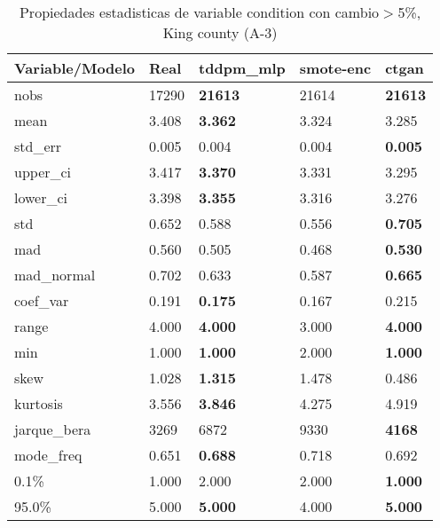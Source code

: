\begin{table}[H]
\centering
\fontsize{8}{14}\selectfont
\caption{Propiedades estadisticas de variable condition con cambio\ensuremath{>}5\%, King county (A-3)}
\label{table-stats-king county-a-3-condition-short}
\begin{tabular}{|l|m{10em}|m{10em}|m{10em}|m{10em}|}
\hline
 \rowcolor[gray]{0.8}
Variable/Modelo & Real & tddpm\_mlp & smote-enc & ctgan \\
\hline nobs & 17290 & \bfseries 21613 & \cellcolor[rgb]{0.9, 0.54, 0.52} 21614 & \bfseries 21613 \\
\hline mean & 3.408 & \bfseries 3.362 & 3.324 & \cellcolor[rgb]{0.9, 0.54, 0.52} 3.285 \\
\hline std\_err & 0.005 & 0.004 & \cellcolor[rgb]{0.9, 0.54, 0.52} 0.004 & \bfseries 0.005 \\
\hline upper\_ci & 3.417 & \bfseries 3.370 & 3.331 & \cellcolor[rgb]{0.9, 0.54, 0.52} 3.295 \\
\hline lower\_ci & 3.398 & \bfseries 3.355 & 3.316 & \cellcolor[rgb]{0.9, 0.54, 0.52} 3.276 \\
\hline std & 0.652 & 0.588 & \cellcolor[rgb]{0.9, 0.54, 0.52} 0.556 & \bfseries 0.705 \\
\hline mad & 0.560 & 0.505 & \cellcolor[rgb]{0.9, 0.54, 0.52} 0.468 & \bfseries 0.530 \\
\hline mad\_normal & 0.702 & 0.633 & \cellcolor[rgb]{0.9, 0.54, 0.52} 0.587 & \bfseries 0.665 \\
\hline coef\_var & 0.191 & \bfseries 0.175 & \cellcolor[rgb]{0.9, 0.54, 0.52} 0.167 & 0.215 \\
\hline range & 4.000 & \bfseries 4.000 & \cellcolor[rgb]{0.9, 0.54, 0.52} 3.000 & \bfseries 4.000 \\
\hline min & 1.000 & \bfseries 1.000 & \cellcolor[rgb]{0.9, 0.54, 0.52} 2.000 & \bfseries 1.000 \\
\hline skew & 1.028 & \bfseries 1.315 & 1.478 & \cellcolor[rgb]{0.9, 0.54, 0.52} 0.486 \\
\hline kurtosis & 3.556 & \bfseries 3.846 & 4.275 & \cellcolor[rgb]{0.9, 0.54, 0.52} 4.919 \\
\hline jarque\_bera & 3269 & 6872 & \cellcolor[rgb]{0.9, 0.54, 0.52} 9330 & \bfseries 4168 \\
\hline mode\_freq & 0.651 & \bfseries 0.688 & \cellcolor[rgb]{0.9, 0.54, 0.52} 0.718 & 0.692 \\
\hline 0.1\% & 1.000 & \cellcolor[rgb]{0.9, 0.54, 0.52} 2.000 & \cellcolor[rgb]{0.9, 0.54, 0.52} 2.000 & \bfseries 1.000 \\
\hline 95.0\% & 5.000 & \bfseries 5.000 & \cellcolor[rgb]{0.9, 0.54, 0.52} 4.000 & \bfseries 5.000 \\
\hline
\end{tabular}
\end{table}
